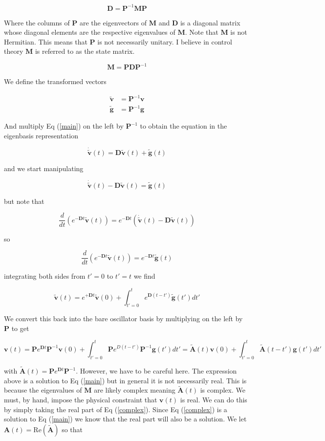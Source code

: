 \documentclass[12pt]{article}
\newcommand{\bv}[1]{\boldsymbol{#1}}
\begin{document}
\[
\bv{D} = \bv{P}^{-1} \bv{M} \bv{P}
\]

Where the columns of $\bv{P}$ are the eigenvectors of $\bv{M}$ and $\bv{D}$ is a diagonal matrix whose diagonal elements are the respective eigenvalues of $\bv{M}$. Note that $\bv{M}$ is not Hermitian. This means that $\bv{P}$ is not necessarily unitary. I believe in control theory $\bv{M}$ is referred to as the state matrix.

\[\bv{M} = \bv{P} \bv{D} \bv{P}^{-1}\]

We define the transformed vectors

\begin{align*}
\tilde{\bv{v}} &= \bv{P}^{-1} \bv{v}\\
\tilde{\bv{g}} &= \bv{P}^{-1} \bv{g}
\end{align*}

And multiply Eq (\ref{main}) on the left by $\bv{P}^{-1}$ to obtain the equation in the eigenbasis representation

\[
\dot{\tilde{\bv{v}}}(t) = \bv{D}\tilde{\bv{v}}(t) + \tilde{\bv{g}}(t)
\]

and we start manipulating

\[
\dot{\tilde{\bv{v}}}(t) - \bv{D}\tilde{\bv{v}}(t) = \tilde{\bv{g}}(t)
\]

but note that

\[
\frac{d}{dt} \left(e^{-\bv{D}t} \tilde{\bv{v}}(t)\right) = e^{-\bv{D}t} (\dot{\tilde{\bv{v}}}(t) - \bv{D}\tilde{\bv{v}}(t))
\]

so

\[
\frac{d}{dt} \left(e^{-\bv{D}t} \tilde{\bv{v}}(t)\right) = e^{-\bv{D}t}\tilde{\bv{g}}(t)
\]

integrating both sides from $t'=0$ to $t'=t$ we find

\[
\tilde{\bv{v}}(t) = e^{+\bv{D}t}\tilde{\bv{v}}(0) + \int_{t'=0}^{t} e^{\bv{D}(t-t')} \tilde{\bv{g}}(t') dt'
\]

We convert this back into the bare oscillator basis by multiplying on the left by $\bv{P}$ to get 

\begin{equation}
\bv{v}(t) = \bv{P} e^{\bv{D}t} \bv{P}^{-1}\bv{v}(0) + \int_{t'=0}^t \bv{P}e^{D(t-t')}\bv{P}^{-1} \bv{g}(t') dt' = \tilde{\bv{A}}(t) \bv{v}(0) + \int_{t'=0}^t \tilde{\bv{A}}(t-t') \bv{g}(t') dt'
\label{complex}
\end{equation}

with $\tilde{\bv{A}}(t) =  \bv{P} e^{\bv{D}t} \bv{P}^{-1}$. However, we have to be careful here. The expression above is a solution to Eq (\ref{main}) but in general it is not necessarily real. This is because the eigenvalues of $\bv{M}$ are likely complex meaning $\tilde{\bv{A}}(t)$ is complex. We must, by hand, impose the physical constraint that $\bv{v}(t)$ is real. We can do this by simply taking the real part of Eq (\ref{complex}). Since Eq (\ref{complex}) is a solution to Eq (\ref{main}) we know that the real part will also be a solution. We let $\bv{A}(t) = \text{Re}(\tilde{\bv{A}})$ so that 
\end{document}
